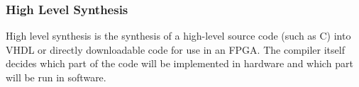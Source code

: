 		\subsubsection{High Level Synthesis}
			High level synthesis is the synthesis of a high-level source code (such as C) into VHDL or directly downloadable code for use in an FPGA. The compiler itself decides which part of the code will be implemented in hardware and which part will be run in software.